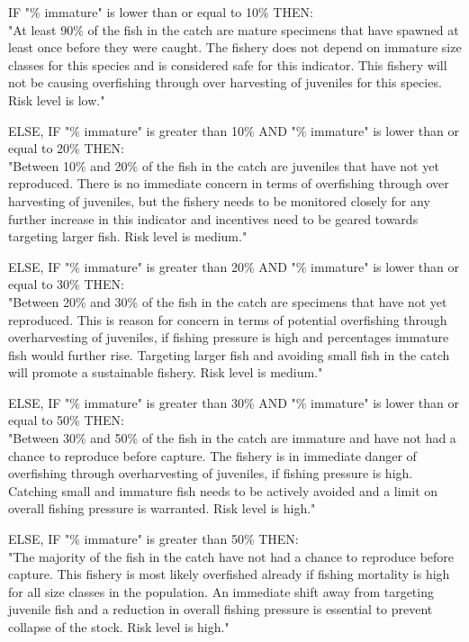 \clearpage
\newpage

IF "\% immature" is lower than or equal to 10\% THEN:\\[0cm]
"At least 90\% of the fish in the catch are mature specimens that have spawned at least once before they were caught. The fishery does not depend on immature size classes for this species and is considered safe for this indicator. This fishery will not be causing overfishing through over harvesting of juveniles for this species. Risk level is low."

ELSE, IF "\% immature" is greater than 10\% AND "\% immature" is lower than or equal to 20\% THEN:\\[0cm]
"Between 10\% and 20\% of the fish in the catch are juveniles that have not yet reproduced. There is no immediate concern in terms of overfishing through over harvesting of juveniles, but the fishery needs to be monitored closely for any further increase in this indicator and incentives need to be geared towards targeting larger fish. Risk level is medium."

ELSE, IF "\% immature" is greater than 20\% AND "\% immature" is lower than or equal to 30\% THEN:\\[0cm]
"Between 20\% and 30\% of the fish in the catch are specimens that have not yet reproduced. This is reason for concern in terms of potential overfishing through overharvesting of juveniles, if fishing pressure is high and percentages immature fish would further rise. Targeting larger fish and avoiding small fish in the catch will promote a sustainable fishery. Risk level is medium."

ELSE, IF "\% immature" is greater than 30\% AND "\% immature" is lower than or equal to 50\% THEN:\\[0cm]
"Between 30\% and 50\% of the fish in the catch are immature and have not had a chance to reproduce before capture. The fishery is in immediate danger of overfishing through overharvesting of juveniles, if fishing pressure is high.  Catching small and immature fish needs to be actively avoided and a limit on overall fishing pressure is warranted. Risk level is high."

ELSE, IF "\% immature" is greater than 50\% THEN:\\[0cm]
"The majority of the fish in the catch have not had a chance to reproduce before capture. This fishery is most likely overfished already if fishing mortality is high for all size classes in the population. An immediate shift away from targeting juvenile fish and a reduction in overall fishing pressure is essential to prevent collapse of the stock. Risk level is high."

